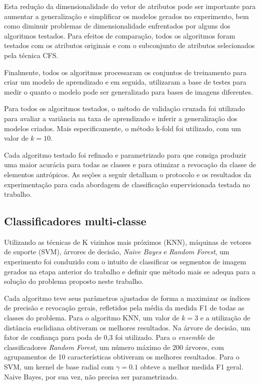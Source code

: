 Esta redução da dimensionalidade do vetor de atributos pode ser importante para aumentar a generalização e simplificar os modelos gerados no experimento, bem como diminuir problemas de dimensionalidade enfrentados por alguns dos algoritmos testados. Para efeitos de comparação, todos os algoritmos foram testados com os atributos originais e com o subconjunto de atributos selecionados pela técnica CFS.

Finalmente, todos os algoritmos processaram os conjuntos de treinamento para criar um modelo de aprendizado e em seguida, utilizaram a base de testes para medir o quanto o modelo pode ser generalizado para bases de imagens diferentes.

Para todos os algoritmos testados, o método de validação cruzada foi utilizado para avaliar a variância na taxa de aprendizado e inferir a generalização dos modelos criados. Mais especificamente, o método k-fold foi utilizado, com um valor de $k=10$.

Cada algoritmo testado foi refinado e parametrizado para que consiga produzir uma maior acurácia para todas as classes e para otimizar a revocação da classe de elementos antrópicos. As seções a seguir detalham o protocolo e os resultados da experimentação para cada abordagem de classificação supervisionada testada no trabalho.

\subsection{Classificadores multi-classe}

Utilizando as técnicas de K vizinhos mais próximos (KNN), máquinas de vetores de suporte (SVM), árvores de decisão, \textit{Naive Bayes} e \textit{Random Forest}, um experimento foi conduzido com o intuito de classificar os segmentos de imagem gerados na etapa anterior do trabalho e definir que método mais se adequa para a solução do problema proposto neste trabalho.

Cada algoritmo teve seus parâmetros ajustados de forma a maximizar os índices de precisão e revocação gerais, refletidos pela média da medida F1 de todas as classes do problema. Para o algoritmo KNN, um valor de $k=3$ e a utilização de distância euclidiana obtiveram os melhores resultados. Na árvore de decisão, um fator de confiança para poda de 0,3 foi utilizado. Para o \textit{ensemble} de classificadores \textit{Random Forest}, um número máximo de 200 árvores, com agrupamentos de 10 características obtiveram os melhores resultados. Para o SVM, um kernel de base radial com $\gamma = 0.1$ obteve a melhor medida F1 geral. Naive Bayes, por sua vez, não precisa ser parametrizado.

